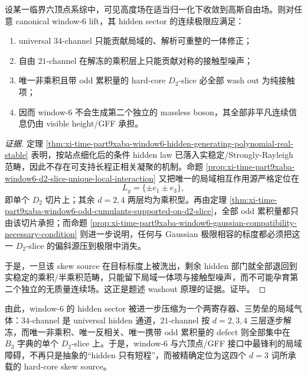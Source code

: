 \begin{conjecture}\label{conj:xi-time-part9xaba-window6-sixvertex-gff-d2slice-washout}
设某一临界六顶点系综中，可见高度场在适当归一化下收敛到高斯自由场。则对任意 canonical window-\(6\) lift，其 hidden sector 的连续极限应满足：
\begin{enumerate}
  \item universal \(34\)-channel 只能贡献局域的、解析可重整的一体修正；
  \item 自由 \(21\)-channel 在解冻的乘积层上只能贡献对称的接触型噪声；
  \item 唯一非乘积且带 odd 累积量的 hard-core \(D_2\)-slice 必全部 wash out 为纯接触项；
  \item 因而 window-\(6\) 不会生成第二个独立的 massless boson，其全部非平凡连续信息仍由 visible height/GFF 承担。
\end{enumerate}
\end{conjecture}
\begin{proof}[证据]
定理 \ref{thm:xi-time-part9xaba-window6-hidden-generating-polynomial-real-stable} 表明，按站点细化后的条件 hidden law 已落入实稳定/Strongly-Rayleigh 范畴，因此不存在可支持长程正相关凝聚的机制。命题 \ref{prop:xi-time-part9xaba-window6-d2-slice-unique-local-interaction} 又把唯一的局域相互作用源严格定位在
\[
L_y=\{\pm e_1\pm e_3\},
\]
即单个 \(D_2\) 切片上；其余 \(d=2,4\) 两层均为乘积型。再由定理 \ref{thm:xi-time-part9xaba-window6-odd-cumulants-supported-on-d2-slice}，全部 odd 累积量都只由该切片承担；而命题 \ref{prop:xi-time-part9xaba-window6-gaussian-compatibility-necessary-condition} 则进一步说明，任何与 Gaussian 极限相容的标度都必须把这一 \(D_2\)-slice 的偏斜源压到极限中消失。

于是，一旦该 skew source 在目标标度上被洗出，剩余 hidden 部门就全部退回到实稳定的乘积/半乘积范畴，只能留下局域一体项与接触型噪声，而不可能孕育第二个独立的无质量连续场。这正是题述 washout 原理的证据。证毕。
\end{proof}

\noindent
由此，window-\(6\) 的 hidden sector 被进一步压缩为一个两寄存器、三势垒的局域气体：\(34\)-channel 是 universal hidden 通道，\(21\)-channel 按 \(d=2,3,4\) 三层逐步解冻，而唯一非乘积、唯一反相关、唯一携带 odd 累积量的 defect 则全部集中在 \(B_3\) 字典的单个 \(D_2\)-slice 上。于是，window-\(6\) 与六顶点/GFF 接口中最锋利的局域障碍，不再只是抽象的“hidden 只有短程”，而被精确定位为这四个 \(d=3\) 词所承载的 hard-core skew source。

\endinput
